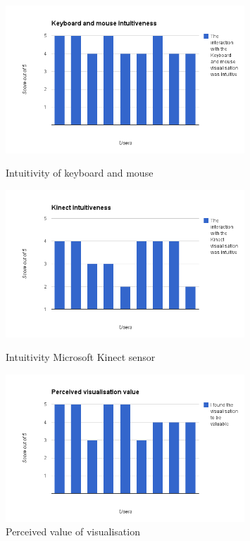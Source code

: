 \begin{figure}[H]
  \centering
      \includegraphics[width=0.8\textwidth]{images/charts/chart_1.png}
  \caption{Intuitivity of keyboard and mouse}  
    \label{fig:chart1}
      \includegraphics[width=0.8\textwidth]{images/charts/chart_2.png}
  \caption{Intuitivity Microsoft Kinect sensor}  
    \label{fig:chart2}
      \includegraphics[width=0.8\textwidth]{images/charts/chart_3.png}
  \caption{Perceived value of visualisation}  
    \label{fig:chart3}
\end{figure}

